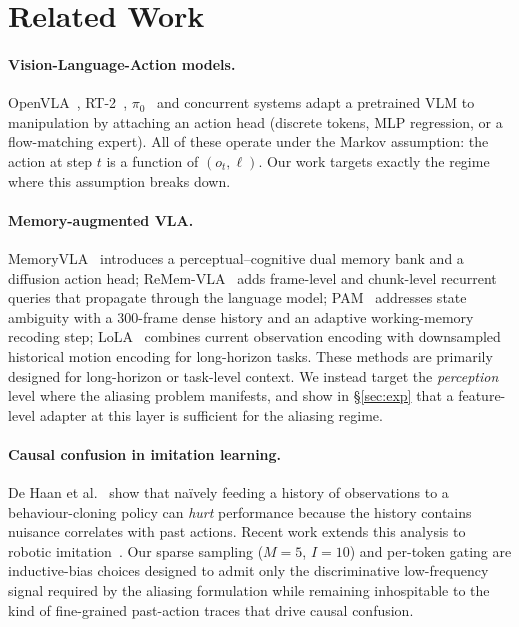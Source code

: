 \documentclass[11pt]{article}
\begin{document}
\section{Related Work}
\label{sec:related}

\paragraph{Vision-Language-Action models.}
OpenVLA~\cite{kim2024openvla}, RT-2~\cite{brohan2023rt2}, $\pi_0$~\cite{black2024pi0}
and concurrent systems adapt a pretrained VLM to manipulation by attaching an
action head (discrete tokens, MLP regression, or a flow-matching expert). All of
these operate under the Markov assumption: the action at step $t$ is a function
of $(o_t, \ell)$. Our work targets exactly the regime where this assumption
breaks down.

\paragraph{Memory-augmented VLA.}
MemoryVLA~\cite{shi2025memoryvla} introduces a perceptual--cognitive dual memory
bank and a diffusion action head; ReMem-VLA~\cite{remem2025} adds frame-level and
chunk-level recurrent queries that propagate through the language model;
PAM~\cite{pam2025} addresses state ambiguity with a 300-frame dense history and
an adaptive working-memory recoding step; LoLA~\cite{lola2025} combines current
observation encoding with downsampled historical motion encoding for long-horizon
tasks. These methods are primarily designed for long-horizon or task-level
context. We instead target the \emph{perception} level where the aliasing
problem manifests, and show in \S\ref{sec:exp} that a feature-level adapter at
this layer is sufficient for the aliasing regime.

\paragraph{Causal confusion in imitation learning.}
De Haan et al.~\cite{dehaan2019causal} show that na\"ively feeding a history of
observations to a behaviour-cloning policy can \emph{hurt} performance because
the history contains nuisance correlates with past actions. Recent work
extends this analysis to robotic imitation~\cite{causalbot2025}. Our sparse
sampling ($M{=}5$, $I{=}10$) and per-token gating are inductive-bias choices
designed to admit only the discriminative low-frequency signal required by the
aliasing formulation while remaining inhospitable to the kind of fine-grained
past-action traces that drive causal confusion.
\end{document}

